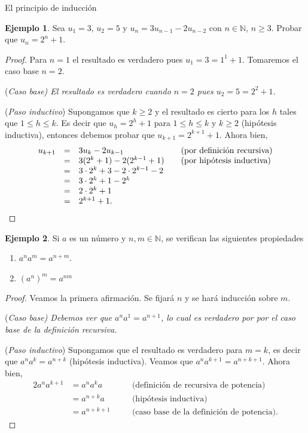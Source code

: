 \documentclass[11pt,spanish,makeidx]{amsbook}
\theoremstyle{definition}
\newtheorem{ejemplo}{Ejemplo}[section]
\theoremstyle{remark}
\begin{document}
\begin{section}{El principio de inducción}
\begin{ejemplo}
Sea $u_1 = 3$, $u_2 = 5$ y $u_n = 3u_{n-1}  - 2u_{n-2}$ con $n \in  \mathbb N$, $n \ge 3$. Probar que $u_n = 2^n + 1$.
\begin{proof} Para $n=1$ el resultado es verdadero pues $u_1 =3 = 1^1 +1$. Tomaremos el caso  base $n=2$.

\noindent(\it Caso  base\rm) El resultado es verdadero cuando  $n=2$ pues $u_2 = 5 =2^2+1$.

\noindent ({\it Paso  inductivo}) Supongamos que $k \ge 2$ y el resultado  es cierto para los $h$ tales que  $1 \le h \le k$. Es decir que $u_h = 2^h+1$ para $1 \le h \le k$ y $k \ge 2$ (hipótesis inductiva), entonces debemos probar que $u_{k+1} = 2^{k+1}+1$. Ahora bien, 
$$
\begin{matrix} u_{k+1} &=& 3u_k -2u_{k-1} \hfill &\quad \text{(por definición recursiva)} \hfill \\
&=& 3(2^k+1)-2(2^{k-1}+1) \hfill &\quad \text{(por hipótesis inductiva})\hfill \\
&=& 3\cdot 2^k+3-2\cdot 2^{k-1}-2 \hfill & \\
&=& 3\cdot 2^k+1- 2^{k} \hfill & \\
&=& 2\cdot 2^k+1 \hfill & \\
&=& 2^{k+1}+1. \hfill & 
\end{matrix}
$$
\end{proof}
\end{ejemplo}

\begin{ejemplo}
Si $a$ es un número y $n,m \in \mathbb N$,  se verifican las siguientes propiedades
\begin{enumerate}
\item \label{pot+pot}$a^{n}a^m = a^{n+m}$.
\item \label{potpot}$(a^n)^m = a^{nm}$
\end{enumerate}
\begin{proof}
Veamos la primera afirmación. Se fijará $n$ y se hará inducción sobre $m$. 

\noindent(\it Caso  base\rm) Debemos ver que $a^{n}a^1 = a^{n+1}$, lo cual es verdadero por  por el caso  base de la definición recursiva. 

\noindent ({\it Paso  inductivo}) Supongamos que el resultado es verdadero para $m=k$, es decir que $a^{n}a^k = a^{n+k}$ (hipótesis inductiva). Veamos que  $a^{n}a^{k+1} = a^{n+k+1}$. Ahora bien, 
\begin{alignat*}2
a^{n}a^{k+1} &= a^{n}a^{k}a&  & \text{(definición de recursiva de potencia)} \\
&= a^{n+k}a& & \text{(hipótesis inductiva)} \\
&= a^{n+k+1}\quad&  & \text{(caso  base de la definición de potencia)}. 
\end{alignat*}


\end{proof}
\end{ejemplo}
\end{section}
\end{document}

